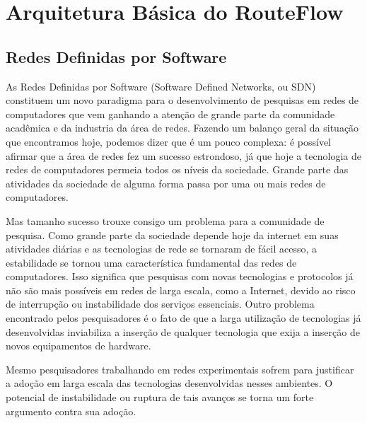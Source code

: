 \chapter{Arquitetura Básica do RouteFlow}

\section{Redes Definidas por Software} As Redes Definidas
por Software (Software Defined Networks, ou SDN) constituem
um novo paradigma para o desenvolvimento de pesquisas em
redes de computadores que vem ganhando a atenção de grande
parte da comunidade acadêmica e da industria da área de
redes. Fazendo um balanço geral da situação que encontramos
hoje, podemos dizer que é um pouco complexa: é possível afirmar
que a área de redes fez um sucesso estrondoso, já que hoje a
tecnologia de redes de computadores permeia todos os níveis
da sociedade. Grande parte das atividades da sociedade de
alguma forma passa por uma ou mais redes de computadores.

Mas tamanho sucesso trouxe consigo um problema para a comunidade
de pesquisa. Como grande parte da sociedade depende hoje da
internet em suas atividades diárias e as tecnologias de rede
se tornaram de fácil acesso, a estabilidade se tornou uma
característica fundamental das redes de computadores. Isso
significa que pesquisas com novas tecnologias e protocolos
já não são mais possíveis em redes de larga escala, como a
Internet, devido ao risco de interrupção ou instabilidade
dos serviços essenciais. Outro problema encontrado pelos
pesquisadores é o fato de que a larga utilização de
tecnologias já desenvolvidas inviabiliza a inserção de
qualquer tecnologia que exija a inserção de novos
equipamentos de hardware.

Mesmo pesquisadores trabalhando em redes experimentais sofrem
para justificar a adoção em larga escala das tecnologias
desenvolvidas nesses ambientes. O potencial de instabilidade
ou ruptura de tais avanços se torna um forte argumento
contra sua adoção.

